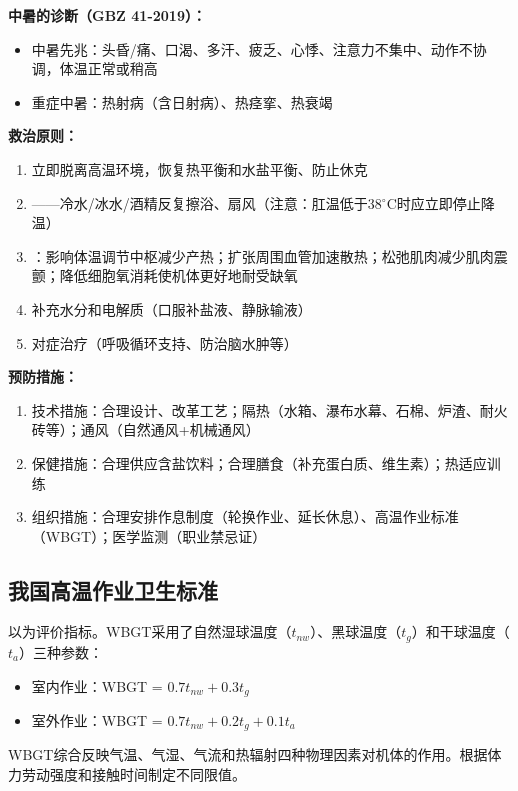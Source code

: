 \begin{keybox}
\textbf{中暑的诊断（GBZ 41-2019）：}
\begin{itemize}[leftmargin=*]
    \item 中暑先兆：头昏/痛、口渴、多汗、疲乏、心悸、注意力不集中、动作不协调，体温正常或稍高
    \item 重症中暑：热射病（含日射病）、热痉挛、热衰竭
\end{itemize}

\textbf{救治原则：}
\begin{enumerate}[leftmargin=*]
    \item 立即脱离高温环境，恢复热平衡和水盐平衡、防止休克
    \item {}——冷水/冰水/酒精反复擦浴、扇风（注意：肛温低于38$^\circ$C时应立即停止降温）
    \item {}：影响体温调节中枢减少产热；扩张周围血管加速散热；松弛肌肉减少肌肉震颤；降低细胞氧消耗使机体更好地耐受缺氧
    \item 补充水分和电解质（口服补盐液、静脉输液）
    \item 对症治疗（呼吸循环支持、防治脑水肿等）
\end{enumerate}

\textbf{预防措施：}
\begin{enumerate}[leftmargin=*]
    \item 技术措施：合理设计、改革工艺；隔热（水箱、瀑布水幕、石棉、炉渣、耐火砖等）；通风（自然通风+机械通风）
    \item 保健措施：合理供应含盐饮料；合理膳食（补充蛋白质、维生素）；热适应训练
    \item 组织措施：合理安排作息制度（轮换作业、延长休息）、高温作业标准（WBGT）；医学监测（职业禁忌证）
\end{enumerate}
\end{keybox}

\subsection{我国高温作业卫生标准}

以为评价指标。WBGT采用了自然湿球温度（$t_{nw}$）、黑球温度（$t_g$）和干球温度（$t_a$）三种参数：
\begin{itemize}[leftmargin=*]
    \item 室内作业：WBGT = $0.7t_{nw} + 0.3t_g$
    \item 室外作业：WBGT = $0.7t_{nw} + 0.2t_g + 0.1t_a$
\end{itemize}
WBGT综合反映气温、气湿、气流和热辐射四种物理因素对机体的作用。根据体力劳动强度和接触时间制定不同限值。

